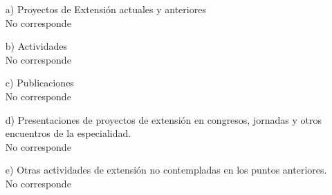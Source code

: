 \begin{enumerate}[leftmargin=0.8cm]
    \item[a)]{Proyectos de Extensión actuales y anteriores
        \\ No corresponde
    }

    \item[b)]{Actividades
        \\ No corresponde
    }

    \item[c)]{Publicaciones
        \\ No corresponde
    }

    \item[d)]{Presentaciones de proyectos de extensión en congresos, jornadas y otros encuentros de la especialidad.
        \\ No corresponde
    }

    \item[e)]{Otras actividades de extensión no contempladas en los puntos anteriores.
        \\ No corresponde
    }
\end{enumerate}
